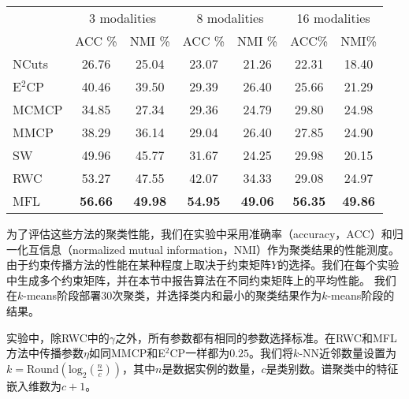 \begin{table}[t]
	\label{tab3:modal_voc}
	\centering
	\setlength{\tabcolsep}{8pt}
	\begin{tabular}{lcccccc}
		\toprule
		&\multicolumn{2}{c}{3 modalities} & \multicolumn{2}{c}{8 modalities} & \multicolumn{2}{c}{16 modalities} \\
		\cmidrule(lr){2-3}
		\cmidrule(lr){4-5}
		\cmidrule(lr){6-7}
		& ACC \% & NMI \% & ACC \% & NMI \% & ACC\% & NMI\%		\\
		\midrule 
		NCuts\cite{shi2000normalized} & 26.76 & 25.04 & 23.07 & 21.26 & 22.31 & 18.40 \\
		E$^2$CP\cite{lu2010constrained} & 40.46 & 39.50 & 29.39 & 26.40 & 25.66 & 21.29 \\ 
		MCMCP\cite{fu2012modalities} & 34.85 & 27.34 & 29.36 & 24.79 & 29.80 & 24.98 \\  
		MMCP\cite{fu2011multi} & 38.29 & 36.14 & 29.04 & 26.40 & 27.85 & 24.90 \\
		SW & 49.96 & 45.77 & 31.67 & 24.25 & 29.98 & 20.15 \\ 
		RWC & 53.27 & 47.55 & 42.07 & 34.33 & 29.08 & 24.97 \\ 
		MFL & \textbf{56.66} & \textbf{49.98} & \textbf{54.95} & \textbf{49.06} & \textbf{56.35} & \textbf{49.86} \\ 
		\bottomrule
	\end{tabular}
\end{table}
为了评估这些方法的聚类性能，我们在实验中采用准确率（accuracy，ACC）和归一化互信息（normalized mutual information，NMI）作为聚类结果的性能测度。
由于约束传播方法的性能在某种程度上取决于约束矩阵${Y}$的选择。我们在每个实验中生成多个约束矩阵，并在本节中报告算法在不同约束矩阵上的平均性能。
我们在$k$-means阶段部署30次聚类，并选择类内和最小的聚类结果作为$k$-means阶段的结果。

实验中，除RWC中的$\gamma $之外，所有参数都有相同的参数选择标准。在RWC和MFL方法中传播参数$ \eta $如同MMCP和E$^2$CP一样都为$ 0.25 $。我们将$k$-NN近邻数量设置为$ k = \mathrm{Round}(\mathrm{log}_2(\frac{n}{c}))$，其中$ n $是数据实例的数量，$ c $是类别数。谱聚类中的特征嵌入维数为$ c + 1 $。


